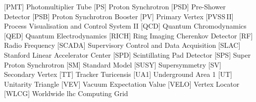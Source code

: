 {\begin{acronym}[AAAAAAA]
 [PMT] {Photomultiplier Tube}
 [PS] {Proton Synchrotron}
 [PSD] {Pre-Shower Detector}
 [PSB] {Proton Synchrotron Booster}
 [PV] {Primary Vertex}
 [PVSS\,II] {Process Visualisation and Control System II}
 [QCD] {Quantum Chromodynamics}
 [QED] {Quantum Electrodynamics}
 [RICH] {Ring Imaging Cherenkov Detector}
 [RF] {Radio Frequency}
 [SCADA] {Supervisory Control and Data Acquisition}
 [SLAC] {Stanford Linear Accelerator Center}
 [SPD] {Scintillating Pad Detector}
 [SPS] {Super Proton Synchrotron}
 [SM] {Standard Model}
 [SUSY] {Supersymmetry}
 [SV] {Secondary Vertex}
 [TT] {Tracker Turicensis}
 [UA1] {Underground Area 1}
 [UT] {Unitarity Triangle}
 [VEV] {Vacuum Expectation Value}
 [VELO] {Vertex Locator}
 [WLCG] {Worldwide \acs{lhc} Computing Grid}
\end{acronym}

}

